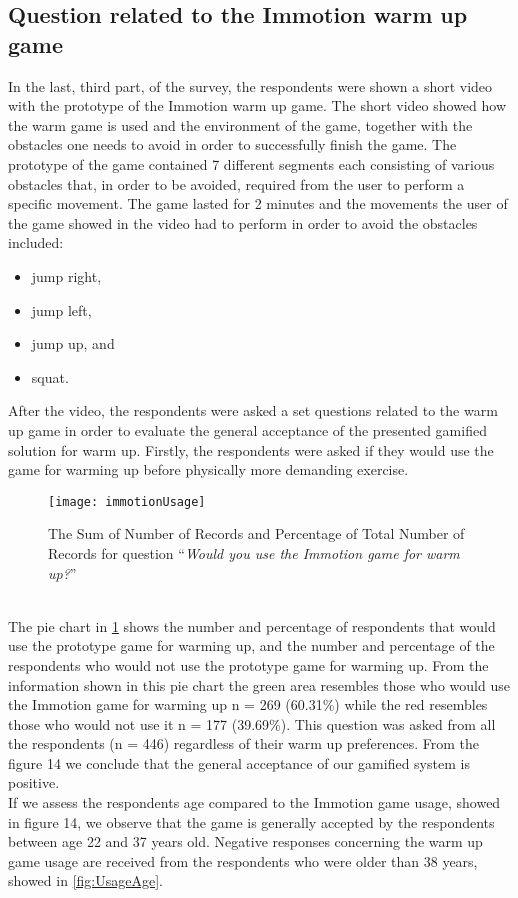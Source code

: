 \subsection{Question related to the Immotion warm up game}
In the last, third part, of the survey, the respondents were shown a short video with the prototype of the Immotion warm up game. The short video showed how the warm game is used and the environment of the game, together with the obstacles one needs to avoid in order to successfully finish the game. The prototype of the game contained 7 different segments each consisting of various obstacles that, in order to be avoided, required from the user to perform a specific movement. The game lasted for 2 minutes and the movements the user of the game showed in the video had to perform in order to avoid the obstacles included: 
\begin{itemize}
\item jump right,
\item jump left,
\item jump up, and
\item squat.
\end{itemize}
After the video, the respondents were asked a set questions related to the warm up game in order to evaluate the general acceptance of the presented gamified solution for warm up. Firstly, the respondents were asked if they would use the game for warming up before physically more demanding exercise. 
\begin{figure}[h]
    \centering
    \texttt{[image: immotionUsage]}
    \caption{The Sum of Number of Records and Percentage of Total Number of Records for question ``\textit{Would you use the Immotion game for warm up?}''}
    \label{fig:immotionUsage}
\end{figure}\\
The pie chart in \ref{fig:immotionUsage} shows the number and percentage of respondents that would use the prototype game for warming up, and the number and percentage of the respondents who would not use the prototype game for warming up. From the information shown in this pie chart the green area resembles those who would use the Immotion game for warming up n = 269 (60.31\%) while the red resembles those who would not use it n = 177 (39.69\%). This question was asked from all the respondents (n = 446) regardless of their warm up preferences. From the figure 14 we conclude that the general acceptance of our gamified system is positive.\\ If we assess the respondents age compared to the Immotion game usage, showed in figure 14, we observe that the game is generally accepted by the respondents between age 22 and 37 years old. Negative responses concerning the warm up game usage are received from the respondents who were older than 38 years, showed in \ref{fig:UsageAge}.\\ 
